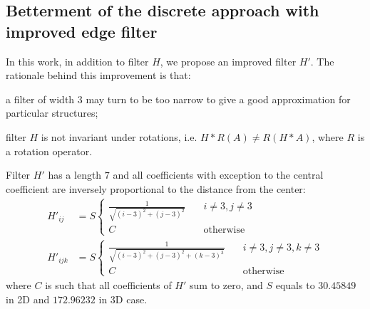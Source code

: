 \documentclass[preprint]{elsarticle}
\begin{document}
\subsection{Betterment of the discrete approach with improved edge filter}
In this work, in addition to filter $H$, we propose an improved filter $H'$. The
rationale behind this improvement is that:
\begin{enumerate*}[label=\alph*)]
\item a filter of width 3 may turn to be too narrow to give a good approximation
  for particular structures;
\item filter $H$ is not invariant under rotations, i.e.
  $H*R(A) \ne R(H*A)$, where $R$ is a rotation operator.
\end{enumerate*}
Filter $H'$ has a length $7$ and all coefficients with exception to the central
coefficient are inversely proportional to the distance from the center:
\begin{equation}
  \begin{aligned}
    H'_{ij} &= S \left\{
    \begin{array}{cc}
      \frac{1}{\sqrt{(i-3)^2 + (j-3)^2}} & \quad i \ne 3, j \ne 3 \\
      C & \quad \text{otherwise}
    \end{array}
    \right. \\
    H'_{ijk} &= S \left\{
    \begin{array}{cc}
      \frac{1}{\sqrt{(i-3)^2 + (j-3)^2 + (k-3)^3}} & \quad i \ne 3, j \ne 3, k
      \ne 3 \\
      C & \quad \text{otherwise}
    \end{array}
    \right.
  \end{aligned}
  \label{eq:filter-7x7}
\end{equation}
where $C$ is such that all coefficients of $H'$ sum to zero, and $S$ equals to
$30.45849$ in 2D and $172.96232$ in 3D case.
\end{document}
